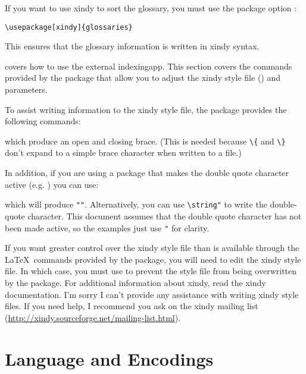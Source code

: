 \documentclass[report,inlinetitle]{nlctdoc}
\begin{document}
If you want to use \gls{xindy} to sort the glossary, you
must use the package option :
\begin{verbatim}
\usepackage[xindy]{glossaries}
\end{verbatim}
This ensures that the glossary information is written in 
\gls*{xindy} syntax.

 covers how to use the external
\gls{indexingapp}. This section covers the commands provided
by the  package that allow you to adjust the
\gls{xindy} style file () and parameters.

To assist writing information to the \gls{xindy} style
file, the  package provides the following
commands:
\begin{definition}[\DescribeMacro{\glsopenbrace}]
\end{definition}
\begin{definition}[\DescribeMacro{\glsclosebrace}]
\end{definition}
which produce an open and closing brace. (This is needed because
\verb|\{| and \verb|\}| don't expand to a simple brace character
when written to a file.)

In addition, if you are using a package that makes the double
quote character active (e.g. ) you can use:
\begin{definition}[\DescribeMacro{\glsquote}]
\end{definition}
which will produce \verb|"|\verb|"|. Alternatively,
you can use \verb|\string"| to write the double-quote character. 
This document assumes that the double quote character has not been
made active, so the examples just use \verb|"| for clarity.

If you want greater control over the \gls{xindy} style file than is
available through the \LaTeX\ commands provided by the
 package, you will need to edit the \gls*{xindy}
style file. In which case, you must use  to prevent the
style file from being overwritten by the 
package. For additional information about \gls*{xindy}, read the
\gls*{xindy} documentation. I'm sorry I can't provide any assistance
with writing \gls*{xindy} style files. If you need help, I recommend
you ask on the \gls*{xindy} mailing list
(\url{http://xindy.sourceforge.net/mailing-list.html}).

\section{Language and Encodings}
\label{sec:langenc}
\end{document}
